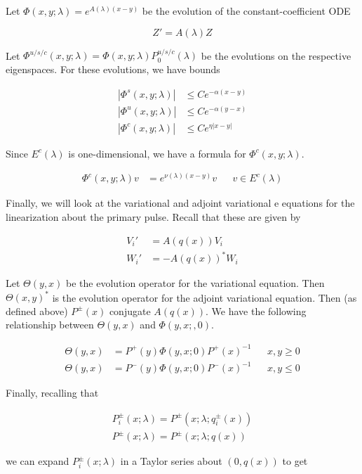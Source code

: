 \documentclass[12pt]{article}
\begin{document}
Let $\Phi(x, y; \lambda) = e^{A(\lambda)(x-y)}$ be the evolution of the constant-coefficient ODE

\[
Z' = A(\lambda) Z
\]

Let $\Phi^{u/s/c}(x, y; \lambda) = \Phi(x, y; \lambda)P^{u/s/c}_0(\lambda)$ be the evolutions on the respective eigenspaces. For these evolutions, we have bounds

\begin{align*}
|\Phi^s(x, y; \lambda)| &\leq C e^{-\alpha(x - y)} \\
|\Phi^u(x, y; \lambda)| &\leq C e^{-\alpha(y - x)} \\
|\Phi^c(x, y; \lambda)| &\leq C e^{\eta|x - y|} 
\end{align*}

Since $E^c(\lambda)$ is one-dimensional, we have a formula for $\Phi^c(x, y; \lambda)$.

\begin{align*}
\Phi^c(x, y; \lambda) v &= e^{\nu(\lambda)(x - y)} v && v \in E^c(\lambda)
\end{align*}

Finally, we will look at the variational and adjoint variational e
equations for the linearization about the primary pulse. Recall that these are given by 

\begin{align*}
V_i' &= A(q(x)) V_i \\
W_i' &= -A(q(x))^* W_i
\end{align*}

Let $\Theta(y, x)$ be the evolution operator for the variational equation. Then $\Theta(x, y)^*$ is the evolution operator for the adjoint variational equation. Then (as defined above) $P^\pm(x)$ conjugate $A(q(x))$. We have the following relationship between $\Theta(y, x)$ and $\Phi(y, x;, 0)$.

\begin{align*}
\Theta(y, x) &= P^+(y) \Phi(y, x; 0) P^+(x)^{-1} && x, y \geq 0 \\
\Theta(y, x) &= P^-(y) \Phi(y, x; 0) P^-(x)^{-1} && x, y \leq 0
\end{align*}

Finally, recalling that

\begin{align*}
P_i^\pm(x; \lambda) = P^\pm(x; \lambda; q_i^\pm(x)) \\
P^\pm(x; \lambda) = P^\pm(x; \lambda; q(x))
\end{align*}

we can expand $P_i^\pm(x; \lambda)$ in a Taylor series about $(0, q(x))$ to get
\end{document}
